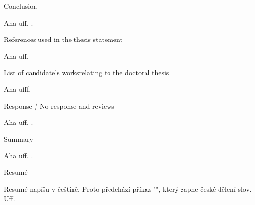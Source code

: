 \sec Conclusion

Aha uff. \lorem.

\nonum\sec References used in the thesis statement 

Aha uff.

\nonum\sec List of candidate's works\nl relating to the doctoral thesis 

Aha ufff.

\nonum\sec Response / No response and reviews 

Aha uff. \lorem.

\nonum\sec Summary

Aha uff. \lorem.

\nonum\sec Resumé

\chyph 
Resumé napíšu v češtině. Proto předchází příkaz "\chyph", který zapne české
dělení slov. Uff.

\bye

